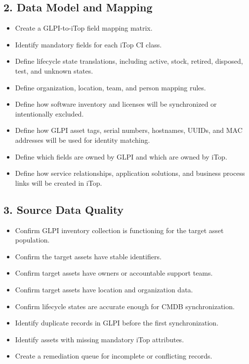 \documentclass[11pt]{article}
\newcommand{\checkbox}{\fbox{\rule{0pt}{1.1ex}\rule{1.1ex}{0pt}}}
\begin{document}
\subsection{2. Data Model and Mapping}
\begin{itemize}
  \item[\checkbox] Create a GLPI-to-iTop field mapping matrix.
  \item[\checkbox] Identify mandatory fields for each iTop CI class.
  \item[\checkbox] Define lifecycle state translations, including active, stock, retired, disposed, test, and unknown states.
  \item[\checkbox] Define organization, location, team, and person mapping rules.
  \item[\checkbox] Define how software inventory and licenses will be synchronized or intentionally excluded.
  \item[\checkbox] Define how GLPI asset tags, serial numbers, hostnames, UUIDs, and MAC addresses will be used for identity matching.
  \item[\checkbox] Define which fields are owned by GLPI and which are owned by iTop.
  \item[\checkbox] Define how service relationships, application solutions, and business process links will be created in iTop.
\end{itemize}

\subsection{3. Source Data Quality}
\begin{itemize}
  \item[\checkbox] Confirm GLPI inventory collection is functioning for the target asset population.
  \item[\checkbox] Confirm the target assets have stable identifiers.
  \item[\checkbox] Confirm target assets have owners or accountable support teams.
  \item[\checkbox] Confirm target assets have location and organization data.
  \item[\checkbox] Confirm lifecycle states are accurate enough for CMDB synchronization.
  \item[\checkbox] Identify duplicate records in GLPI before the first synchronization.
  \item[\checkbox] Identify assets with missing mandatory iTop attributes.
  \item[\checkbox] Create a remediation queue for incomplete or conflicting records.
\end{itemize}
\end{document}
